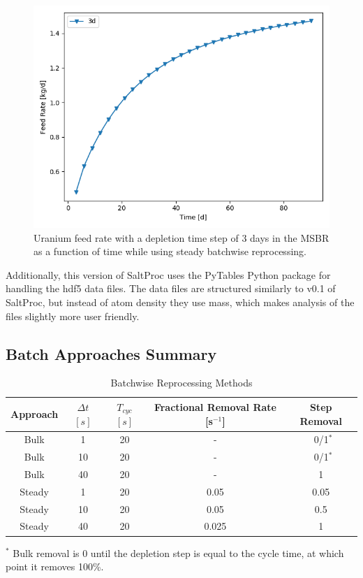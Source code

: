 \begin{figure}[H]
  \centering
  \includegraphics[scale=0.75]{images/feed_U233_3d_90d.png}
  \caption{Uranium feed rate with a depletion time step of 3 days in the MSBR as a function of time while using steady batchwise reprocessing.}
   \label{fig:U-feed-v3}
\end{figure}

Additionally, this version of SaltProc uses the PyTables Python package for handling the hdf5 data files. The data files are structured similarly to v0.1 of SaltProc, but instead of atom density they use mass, which makes analysis of the files slightly more user friendly.

\subsection{Batch Approaches Summary}

\begin{table}[H]
\renewcommand{\arraystretch}{1.25}
\caption{Batchwise Reprocessing Methods}
\label{tab:batch_methods}
\begin{center}
\begin{tabular}{ | c | c | c | c | c | }
 \hline
        Approach & $\Delta t$ $[s]$ & $T_{cyc}$ $[s]$ & Fractional Removal Rate [s$^{-1}$] & Step Removal\\
 \hline
 \hline
        Bulk & 1 & 20 & - & \, 0/1$^{*}$\\
        Bulk & 10 & 20 & - & \, 0/1$^{*}$ \\
        Bulk & 40 & 20 & - & 1 \\
        Steady & 1 & 20 & 0.05 & 0.05\\
        Steady & 10 & 20 & 0.05 & 0.5\\
        Steady & 40 & 20 & 0.025 & 1\\
 \hline
\end{tabular}
\end{center}
\end{table}
        \begin{center}
\footnotesize{$^{*}$ Bulk removal is 0 until the depletion step is equal to the cycle time, at which point it removes 100\%.}\\
        \end{center}

